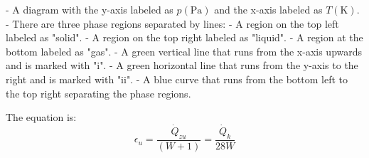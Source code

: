 - A diagram with the y-axis labeled as \( p(\text{Pa}) \) and the x-axis labeled as \( T(\text{K}) \).
- There are three phase regions separated by lines:
  - A region on the top left labeled as "solid".
  - A region on the top right labeled as "liquid".
  - A region at the bottom labeled as "gas".
- A green vertical line that runs from the x-axis upwards and is marked with "i".
- A green horizontal line that runs from the y-axis to the right and is marked with "ii".
- A blue curve that runs from the bottom left to the top right separating the phase regions.

The equation is:
\[ \epsilon_u = \frac{\dot{Q}_{zu}}{(W+1)} = \frac{\dot{Q}_k}{28W} \]